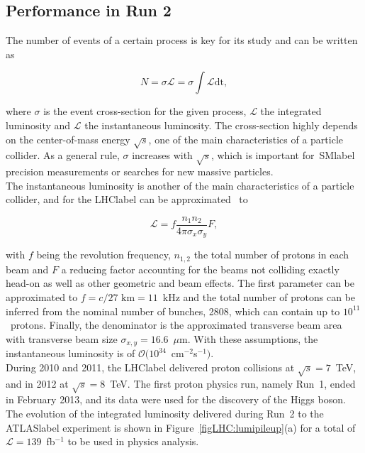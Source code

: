 \subsection{Performance in Run 2}

The number of events of a certain process is key for its study and can be written as

\begin{equation}
    N = \sigma\mathscr{L} = \sigma \int \mathcal{L} \text{dt},
\end{equation}

where $\sigma$ is the event cross-section for the given process, $\mathscr{L}$ the integrated luminosity and $\mathcal{L}$ the instantaneous luminosity. The cross-section highly depends on the center-of-mass energy $\sqrt{s}$, one of the main characteristics of a particle collider. As a general rule, $\sigma$ increases with $\sqrt{s}$, which is important for~\acrshort{SMlabel} precision measurements or searches for new massive particles.\\

The instantaneous luminosity is another of the main characteristics of a particle collider, and for the \acrshort{LHClabel} can be approximated~\cite{luminosity} to

\begin{equation}
    \mathcal{L} = f \frac{n_1n_2}{4\pi\sigma_x\sigma_y} F,
\end{equation}

with $f$ being the revolution frequency, $n_{1,2}$ the total number of protons in each beam and $F$ a reducing factor accounting for the beams not colliding exactly head-on as well as other geometric and beam effects. The first parameter can be approximated to $f=c/27\text{ km} = 11$~kHz and the total number of protons can be inferred from the nominal number of bunches, 2808, which can contain up to $10^{11}$~protons. Finally, the denominator is the approximated transverse beam area with transverse beam size $\sigma_{x,y} = 16.6$~$\mu$m. With these assumptions, the instantaneous luminosity is of $\mathcal{O}(10^{34}$~cm$^{-2}$s$^{-1})$.\\

During 2010 and 2011, the \acrshort{LHClabel} delivered proton collisions at $\sqrt{s}=7$~TeV, and in 2012 at $\sqrt{s}=8$~TeV. The first proton physics run, namely Run~1, ended in February 2013, and its data were used for the discovery of the Higgs boson. The evolution of the integrated luminosity delivered during Run~2 to the \acrshort{ATLASlabel} experiment is shown in Figure~\ref{figLHC:lumipileup}(a) for a total of $\mathscr{L}=139$~fb$^{-1}$ to be used in physics analysis.\\

